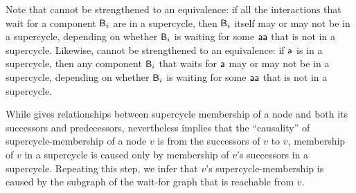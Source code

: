 Note that  cannot be strengthened to an equivalence: if all
the interactions that wait for a component $\mathsf{B}_i$ are in a supercycle, then $\mathsf{B}_i$ itself may or may
not be in a supercycle, depending on whether $\mathsf{B}_i$ is waiting for some $\mathsf{aa}$ that is not in a
supercycle.
%
Likewise,  cannot be strengthened to an equivalence: if $\mathsf{a}$
is in a supercycle, then any component $\mathsf{B}_i$ that waits for $\mathsf{a}$ may or may not be in a 
supercycle, depending on whether $\mathsf{B}_i$ is waiting for some $\mathsf{aa}$ that is not in a supercycle. 




While  gives relationships between supercycle membership of a node and both its
successors and predecessors, nevertheless  implies that the ``causality'' of
supercycle-membership of a node $v$ is from the successors of $v$ to $v$, \ie membership of $v$ in a
supercycle is caused only by membership of $v$'s successors in a supercycle. Repeating this step, we
infer that $v$'s supercycle-membership is caused by the subgraph of the wait-for graph that is
reachable from $v$.





